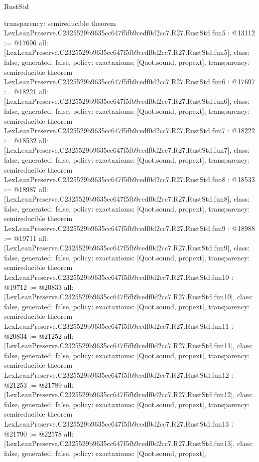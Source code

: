 \begin{lexlean}{RustStd}
\begin{coremodule}
{  transparency: semireducible
}
theorem LexLeanPreserve.C2325529b9635cc647f5fb9cedf0d2cc7.R27.RustStd.fun5 : @13112 := @17696 {
  all: [LexLeanPreserve.C2325529b9635cc647f5fb9cedf0d2cc7.R27.RustStd.fun5],
  class: false,
  generated: false,
  policy: exact{axioms: [Quot.sound, propext]},
  transparency: semireducible
}
theorem LexLeanPreserve.C2325529b9635cc647f5fb9cedf0d2cc7.R27.RustStd.fun6 : @17697 := @18221 {
  all: [LexLeanPreserve.C2325529b9635cc647f5fb9cedf0d2cc7.R27.RustStd.fun6],
  class: false,
  generated: false,
  policy: exact{axioms: [Quot.sound, propext]},
  transparency: semireducible
}
theorem LexLeanPreserve.C2325529b9635cc647f5fb9cedf0d2cc7.R27.RustStd.fun7 : @18222 := @18532 {
  all: [LexLeanPreserve.C2325529b9635cc647f5fb9cedf0d2cc7.R27.RustStd.fun7],
  class: false,
  generated: false,
  policy: exact{axioms: [Quot.sound, propext]},
  transparency: semireducible
}
theorem LexLeanPreserve.C2325529b9635cc647f5fb9cedf0d2cc7.R27.RustStd.fun8 : @18533 := @18987 {
  all: [LexLeanPreserve.C2325529b9635cc647f5fb9cedf0d2cc7.R27.RustStd.fun8],
  class: false,
  generated: false,
  policy: exact{axioms: [Quot.sound, propext]},
  transparency: semireducible
}
theorem LexLeanPreserve.C2325529b9635cc647f5fb9cedf0d2cc7.R27.RustStd.fun9 : @18988 := @19711 {
  all: [LexLeanPreserve.C2325529b9635cc647f5fb9cedf0d2cc7.R27.RustStd.fun9],
  class: false,
  generated: false,
  policy: exact{axioms: [Quot.sound, propext]},
  transparency: semireducible
}
theorem LexLeanPreserve.C2325529b9635cc647f5fb9cedf0d2cc7.R27.RustStd.fun10 : @19712 := @20833 {
  all: [LexLeanPreserve.C2325529b9635cc647f5fb9cedf0d2cc7.R27.RustStd.fun10],
  class: false,
  generated: false,
  policy: exact{axioms: [Quot.sound, propext]},
  transparency: semireducible
}
theorem LexLeanPreserve.C2325529b9635cc647f5fb9cedf0d2cc7.R27.RustStd.fun11 : @20834 := @21252 {
  all: [LexLeanPreserve.C2325529b9635cc647f5fb9cedf0d2cc7.R27.RustStd.fun11],
  class: false,
  generated: false,
  policy: exact{axioms: [Quot.sound, propext]},
  transparency: semireducible
}
theorem LexLeanPreserve.C2325529b9635cc647f5fb9cedf0d2cc7.R27.RustStd.fun12 : @21253 := @21789 {
  all: [LexLeanPreserve.C2325529b9635cc647f5fb9cedf0d2cc7.R27.RustStd.fun12],
  class: false,
  generated: false,
  policy: exact{axioms: [Quot.sound, propext]},
  transparency: semireducible
}
theorem LexLeanPreserve.C2325529b9635cc647f5fb9cedf0d2cc7.R27.RustStd.fun13 : @21790 := @22578 {
  all: [LexLeanPreserve.C2325529b9635cc647f5fb9cedf0d2cc7.R27.RustStd.fun13],
  class: false,
  generated: false,
  policy: exact{axioms: [Quot.sound, propext]},
}
\end{coremodule}
\end{lexlean}
